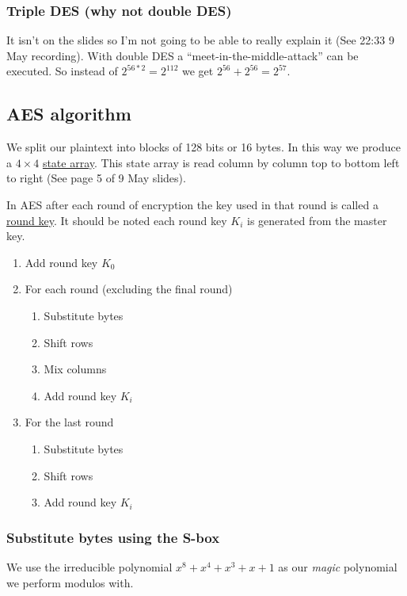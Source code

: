 \documentclass{report}
\begin{document}
\subsubsection{Triple DES (why not double DES)}
It isn't on the slides so I'm not going to be able to really explain it
(See 22:33 9 May recording). With double DES a ``meet-in-the-middle-attack''
can be executed. So instead of $2^{56*2} = 2^{112}$ we get
$2^{56} + 2^{56} = 2^{57}$.

\subsection{AES algorithm}
We split our plaintext into blocks of 128 bits or 16 bytes.
In this way we produce a $4 \times 4$ \underline{state array}. This state array
is read column by column top to bottom left to right (See page 5 of 9 May
slides).

In AES after each round of encryption the key used in that round
is called a \underline{round key}.
It should be noted each round key $K_i$ is generated from the master key.

\begin{enumerate}
    \item Add round key $K_0$
    \item For each round (excluding the final round)
        \begin{enumerate}
            \item Substitute bytes
            \item Shift rows
            \item Mix columns
            \item Add round key $K_i$
        \end{enumerate}
    \item For the last round
        \begin{enumerate}
            \item Substitute bytes
            \item Shift rows
            \item Add round key $K_i$
        \end{enumerate}
\end{enumerate}

\subsubsection{Substitute bytes using the S-box}
We use the irreducible polynomial $x^8 + x^4 + x^3 + x + 1$ as our
\textit{magic} polynomial we perform modulos with.
\end{document}
